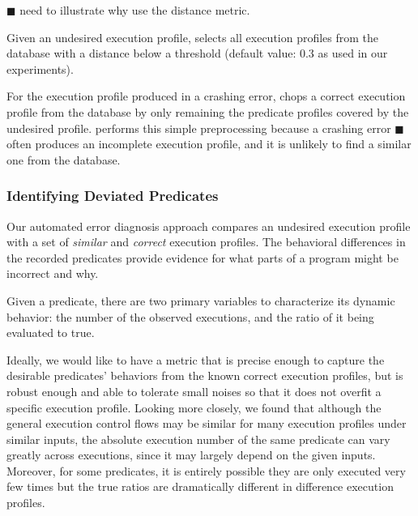 $\blacksquare$ need to illustrate why use the distance metric.

Given an undesired execution profile, \ourtool selects all execution profiles from the database
with a distance below a threshold (default value: 0.3 as used in our
experiments).

For the execution profile produced in a crashing error, \ourtool 
chops a correct execution profile from the database by only remaining the predicate
profiles covered by the undesired profile. \ourtool performs
this simple preprocessing because a crashing error $\blacksquare$
often produces an incomplete execution profile, and it is unlikely
to find a similar one from the database.


\subsubsection{Identifying Deviated Predicates}
\label{sec:deviation}


Our
automated error diagnosis approach compares an undesired execution profile with a set
of \textit{similar} and \textit{correct} execution profiles. 
The behavioral differences in the recorded predicates provide evidence for what parts of a program might be
incorrect and why. %

Given a predicate, there are two primary variables to
characterize its dynamic behavior: the number of the
observed executions, and the ratio of it being evaluated to true.


Ideally, we would like to have a metric that
is precise enough to capture the desirable predicates' behaviors
from the known correct execution profiles, but is robust enough and
able to tolerate small noises so that it does
not overfit a specific execution profile.
Looking more closely, we found that although
the general execution control flows may be similar for many 
execution profiles under similar inputs, the absolute execution number of the same predicate
can vary greatly across executions, since it may
largely depend on the given inputs. Moreover, for
some predicates, it is entirely possible they are
only executed very few times but the true ratios
are dramatically different in difference execution profiles.

